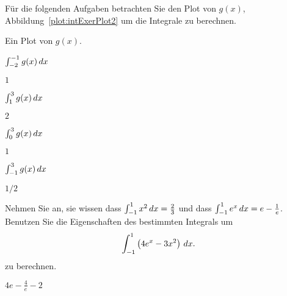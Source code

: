 \begin{exercises}
\noindent Für die folgenden Aufgaben betrachten Sie den Plot von $g(x)$, Abbildung~\ref{plot:intExerPlot2} um die Integrale zu berechnen.
\begin{marginfigure}[0in]
\caption{Ein Plot von $g(x)$.}
\label{plot:intExerPlot2}
\end{marginfigure}

\twocol

\begin{exercise}
$\int_{-2}^{-1} g(x) \, d x$
\begin{answer}
$1$
\end{answer}
\end{exercise}

\begin{exercise}
$\int_1^3 g(x) \, d x$
\begin{answer}
$2$
\end{answer}
\end{exercise}

\begin{exercise}
$\int_0^3 g(x) \, d x$
\begin{answer}
$1$
\end{answer}
\end{exercise}

\begin{exercise}
$\int_{-1}^3 g(x) \, d x$
\begin{answer}
$1/2$
\end{answer}
\end{exercise}

\endtwocol

\begin{exercise}
Nehmen Sie an, sie wissen dass $\int_{-1}^1 x^2 \, d x = \frac{2}{3}$ und dass
$\int_{-1}^1 e^x \, d x= e-\frac{1}{e}$. Benutzen Sie die Eigenschaften des bestimmten Integrals um
\[
\int_{-1}^1 \left(4 e^x - 3 x^2\right) \, d x.
\]
zu berechnen.
\begin{answer}
$4e - \frac{4}{e} - 2$
\end{answer}
\end{exercise}


\end{exercises}
